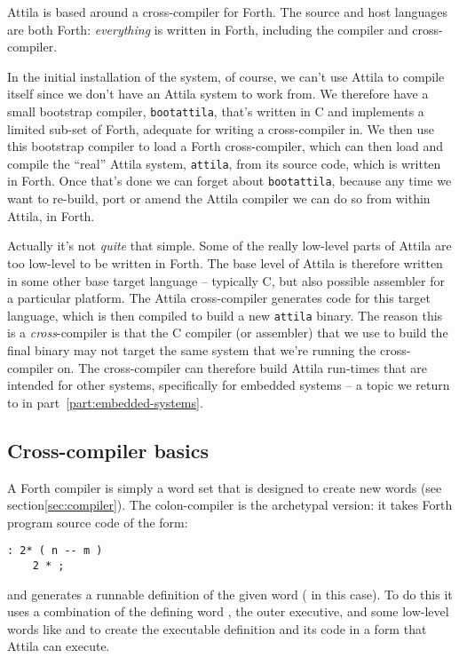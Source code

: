 Attila is based around a cross-compiler for Forth. The source and host
languages are both Forth: \emph{everything} is written in Forth,
including the compiler and cross-compiler.

In the initial installation of the system, of course, we can't use
Attila to compile itself since we don't have an Attila system to work
from. We therefore have a small bootstrap compiler,
\texttt{bootattila}, that's written in C and implements a limited
sub-set of Forth, adequate for writing a cross-compiler in. We then
use this bootstrap compiler to load a Forth cross-compiler, which can
then load and compile the ``real'' Attila system, \texttt{attila},
from its source code, which is written in Forth. Once that's done we
can forget about \texttt{bootattila}, because any time we want to
re-build, port or amend the Attila compiler we can do so from within
Attila, in Forth.

Actually it's not \emph{quite} that simple. Some of the really
low-level parts of Attila are too low-level to be written in
Forth. The base level of Attila is therefore written in some other
base target language -- typically C, but also possible assembler for a
particular platform. The Attila cross-compiler generates code for this
target language, which is then compiled to build a new \texttt{attila}
binary. The reason this is a \emph{cross}-compiler is that the C
compiler (or assembler) that we use to build the final binary may not
target the same system that we're running the cross-compiler on. The
cross-compiler can therefore build Attila run-times that are intended
for other systems, specifically for embedded systems -- a topic we
return to in part~\ref{part:embedded-systems}.

\subsection{Cross-compiler basics}
\label{sec:cross-compiler-basics}

A Forth compiler is simply a word set that is designed to create new
words (see section\ref{sec:compiler}). The colon-compiler is the
archetypal version: it takes Forth program source code of the form:

\begin{verbatim}
: 2* ( n -- m )
    2 * ;
\end{verbatim}

\noindent and generates a runnable definition of the given word
( in this case).  To do this it uses a combination of the
defining word \word{:}, the outer executive, and some low-level words
like  and  to create the executable
definition and its code in a form that Attila can execute.


